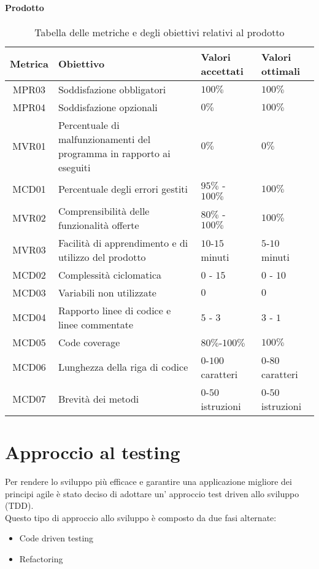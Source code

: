 \paragraph{Prodotto}
\begin{table}[H]
		\begin{center}
			\setlength{\aboverulesep}{0pt}
			\setlength{\belowrulesep}{0pt}
			\setlength{\extrarowheight}{.75ex}
			\begin{tabular}{ c C{6cm} C{3cm} C{3cm} }
				\textbf{Metrica} & \textbf{Obiettivo} & \textbf{Valori accettati} & \textbf{Valori ottimali}  \\
				\toprule
				MPR03 & Soddisfazione  obbligatori & $100 \%$ & $100 \%$ \\
				MPR04 & Soddisfazione  opzionali & $ 0 \%$ & $ 100\%$ \\
				MVR01 & Percentuale di malfunzionamenti del programma in rapporto ai  eseguiti & $ 0\%$  & $0\%$ \\
				MCD01 & Percentuale degli errori gestiti & $ 95\%$ - $100\% $ & $100\%$ \\
				MVR02 & Comprensibilità delle funzionalità offerte & $ 80\%$ - $100\% $ & $100\%$ \\
				MVR03 & Facilità di apprendimento e di utilizzo del prodotto & $10$-$15$ minuti & $5$-$10$ minuti \\
				MCD02 & Complessità ciclomatica & $0$ - $15$ & $0$ - $10$ \\
				MCD03 & Variabili non utilizzate & $0$ & $0$ \\
				MCD04 & Rapporto linee di codice e linee commentate & $5$ - $3$ & $3$ - $1$\\
				MCD05 & Code coverage & $80\%$-$100\%$ & $100\%$ \\
				MCD06 & Lunghezza della riga di codice & $0$-$100$ caratteri & $0$-$80$ caratteri \\
				MCD07 & Brevità dei metodi & $0$-$50$ istruzioni & $0$-$50$ istruzioni \\
				\bottomrule
			\end{tabular}
			\caption{Tabella delle metriche e degli obiettivi relativi al prodotto}
		\end{center}
	\end{table}

\section{Approccio al testing}
Per rendere lo sviluppo più efficace e garantire una applicazione migliore dei principi agile è stato deciso di adottare un' approccio test driven allo sviluppo (TDD). \\
Questo tipo di approccio allo sviluppo è composto da due fasi alternate:
\begin{itemize}
\item Code driven testing
\item Refactoring
\end{itemize}

